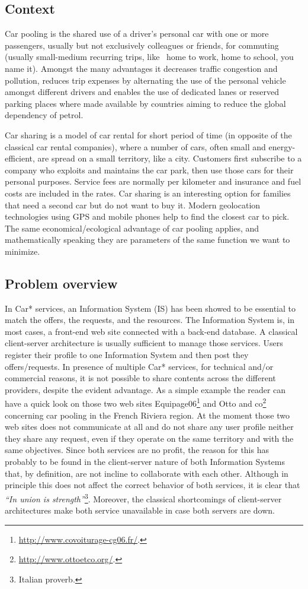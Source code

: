 %
%
%
\subsection{Context}
%
Car pooling is the shared use of a driver's personal car with one or
more passengers, usually but not exclusively colleagues or friends,
for commuting (usually small-medium recurring trips, like \eg\ home to
work, home to school, you name it). Amongst the many advantages it
decreases traffic congestion and pollution, reduces trip expenses
by alternating the use of the personal vehicle amongst different
drivers and enables the use of dedicated lanes or reserved parking
places where made available by countries aiming to
reduce the global dependency of petrol.

Car sharing is a model of car rental for short period of time (in
opposite of the classical car rental companies), where a number of
cars, often small and energy-efficient, are spread on a small
territory, like a city. Customers first subscribe to a company who
exploits and maintains the car park, then use those cars for their
personal purposes. Service fees are normally per kilometer and
insurance and fuel costs are included in the rates. Car sharing is an
interesting option for families that need a second car but do not
want to buy it. Modern geolocation technologies using GPS and mobile
phones help to find the closest car to pick. The same
economical/ecological advantage of car pooling applies, and
mathematically speaking they are parameters of the same function we
want to minimize.

\subsection{Problem overview}
%
In Car* services, an Information System (IS) has been showed to be
essential to match the offers, the requests, and the resources. The
Information System is, in most cases, a front-end web site connected
with a back-end database.  A classical client-server architecture is
usually sufficient to manage those services. Users register their
profile to one Information System and then post they
offers/requests. In presence of multiple Car* services, for technical
and/or commercial reasons, it is not possible to share contents across
the different providers, despite the evident advantage. As a simple
example the reader can have a quick look on those two web sites
Equipage06\footnote{\url{http://www.covoiturage-cg06.fr/}.} and Otto
and co\footnote{\url{http://www.ottoetco.org/}.} concerning car
pooling in the French Riviera region. At the moment those two web
sites does not communicate at all and do not share any user profile
neither they share any request, even if they operate on the same
territory and with the same objectives. Since both services are no
profit, the reason for this has probably to be found in the
client-server nature of both Information Systems that, by definition,
are not incline to collaborate with each other. Although in principle
this does not affect the correct behavior of both services, it is
clear that \emph{``In union is strength''}\footnote{Italian
  proverb.}. Moreover, the classical shortcomings of client-server
architectures make both service unavailable in case both servers are
down.


